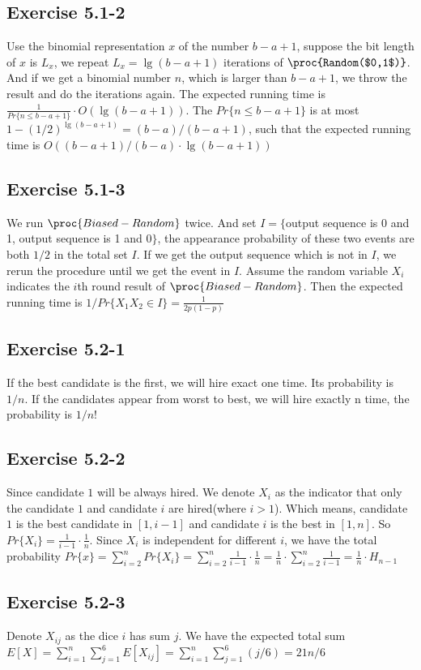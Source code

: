 \documentclass[12pt]{article}
\theoremstyle{definition}
\theoremstyle{remark}
\begin{document}
\subsection*{Exercise 5.1-2}
Use the binomial representation $x$ of the number $b-a+1$, suppose the bit length of $x$ is $L_x$, we repeat $L_x=\lg(b-a+1)$ iterations of $\proc{Random($0,1$)}$. And if we get a binomial number $n$, which is larger than $b-a+1$, we throw the result and do the iterations again. The expected running time is $\frac{1}{Pr\{n\le b-a+1\}}\cdot O(\lg(b-a+1))$. The $Pr\{n\le b-a+1\}$ is at most $1-(1/2)^{\lg(b-a+1)}=(b-a)/(b-a+1)$, such that the expected running time is $O((b-a+1)/(b-a)\cdot\lg(b-a+1))$
\subsection*{Exercise 5.1-3}
We run $\proc{Biased-Random}$ twice. And set $I=\{$output sequence is 0 and 1, output sequence is 1 and 0$\}$, the appearance probability of these two events are both $1/2$ in the total set $I$. If we get the output sequence which is not in $I$, we rerun the procedure until we get the event in $I$. Assume the random variable $X_i$ indicates the $i$th round result of $\proc{Biased-Random}$. Then the expected running time is $1/Pr\{X_1X_2\in I\}=\frac{1}{2p(1-p)}$
\subsection*{Exercise 5.2-1}
If the best candidate is the first, we will hire exact one time. Its probability is $1/n$. If the candidates appear from worst to best, we will hire exactly n time, the probability is $1/n!$
\subsection*{Exercise 5.2-2}
Since candidate $1$ will be always hired. We denote $X_i$ as the indicator that only the candidate $1$ and candidate $i$ are hired(where $i>1$). Which means, candidate $1$ is the best candidate in $[1,i-1]$ and candidate $i$ is the best in $[1,n]$. So $Pr\{X_i\}=\frac{1}{i-1}\cdot\frac{1}{n}$. Since $X_i$ is independent for different $i$, we have the total probability $Pr\{x\}=\sum\limits_{i=2}^{n}Pr\{X_i\}=\sum\limits_{i=2}^{n}\frac{1}{i-1}\cdot\frac{1}{n}=\frac{1}{n}\cdot\sum\limits_{i=2}^{n}\frac{1}{i-1}=\frac{1}{n}\cdot{H_{n-1}}$
\subsection*{Exercise 5.2-3}
Denote $X_{ij}$ as the dice $i$ has sum $j$. We have the expected total sum $E[X]=\sum\limits_{i=1}^{n}\sum\limits_{j=1}^{6}E[X_{ij}]=\sum\limits_{i=1}^{n}\sum\limits_{j=1}^{6}(j/6)=21n/6$
\end{document}
